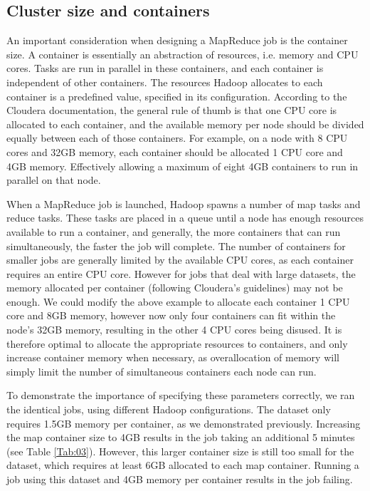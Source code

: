 \documentclass{bioinfo}
\begin{document}
\subsection*{Cluster size and containers}
An important consideration when designing a MapReduce job is the container size. A container is essentially an abstraction of resources, i.e. memory and CPU cores. Tasks are run in parallel in these containers, and each container is independent of other containers.
The resources Hadoop allocates to each container is a predefined value, specified in its configuration. According to the Cloudera documentation, the general rule of thumb is that one CPU core is allocated to each container, and the available memory per node should be divided equally between each of those containers. For example, on a node with 8 CPU cores and 32GB memory, each container should be allocated 1 CPU core and 4GB memory. Effectively allowing a maximum of eight 4GB containers to run in parallel on that node.

When a MapReduce job is launched, Hadoop spawns a number of map tasks and reduce tasks. These tasks are placed in a queue until a node has enough resources available to run a container, and generally, the more containers that can run simultaneously, the faster the job will complete.
The number of containers for smaller jobs are generally limited by the available CPU cores, as each container requires an entire CPU core. However for jobs that deal with large datasets, the memory allocated per container (following Cloudera's guidelines) may not be enough.
We could modify the above example to allocate each container 1 CPU core and 8GB memory, however now only four containers can fit within the node's 32GB memory, resulting in the other 4 CPU cores being disused. It is therefore optimal to
allocate the appropriate resources to containers, and only increase container memory when necessary, as overallocation of memory will simply limit the number of simultaneous containers each node can run.

To demonstrate the importance of specifying these parameters correctly, we ran the identical jobs, using different Hadoop configurations. The \OnePhaseone{} dataset only requires 1.5GB memory per container, as we demonstrated previously.
Increasing the map container size to 4GB results in the job taking an additional 5 minutes (see Table \ref{Tab:03}).
However, this larger container size is still too small for the \FullPhasethree{} dataset, which requires at least 6GB allocated to each map container. Running a job using this dataset and 4GB memory per container results in the job failing.
\end{document}
